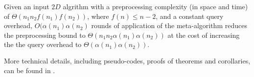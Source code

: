 \begin{corollary}
Given an input $2D$ algrithm with a preprocessing complexity (in space and time)
of $\Theta(n_1 n_2 f(n_1) f(n_2))$, where $f(n) \leq n-2$,
and a constant query overhead,
$O(\alpha(n_1)\alpha(n_2)$ rounds of application of the meta-algorithm
reduces the preprocessing bound to $\Theta(n_1 n_2 \alpha(n_1) \alpha(n_2))$
at the cost of increasing the the query overhead to
$\Theta(\alpha(n_1)\alpha(n_2))$.
\label{cor:meta-2D-query}
\end{corollary}

More technical details, including pseudo-codes, proofs of theorems 
and corollaries, can be found in .
